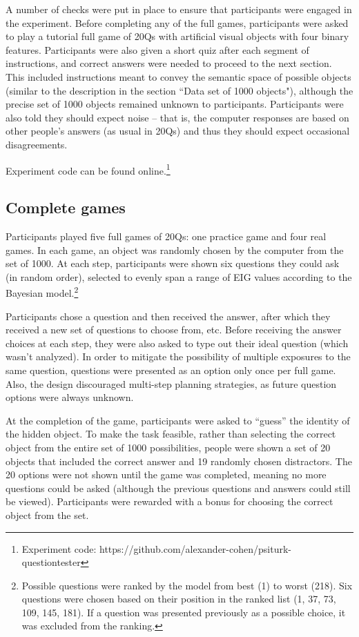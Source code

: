 \documentclass[11pt,letterpaper]{article}
\begin{document}
A number of checks were put in place to ensure that participants were engaged in the experiment. 
Before completing any of the full games, participants were asked to play a tutorial full game of 20Qs with artificial visual objects with four binary features. 
Participants were also given a short quiz after each segment of instructions, and correct answers were needed to proceed to the next section. 
This included instructions meant to convey the semantic space of possible objects (similar to the description in the section ``Data set of 1000 objects"), although the precise set of 1000 objects remained unknown to participants. 
Participants were also told they should expect noise -- that is, the computer responses are based on other people's answers (as usual in 20Qs) and thus they should expect occasional disagreements.

Experiment code can be found online.\footnote{Experiment code: https://github.com/alexander-cohen/psiturk-questiontester}

\subsection*{Complete games}

Participants played five full games of 20Qs: one practice game and four real games. 
In each game, an object was randomly chosen by the computer from the set of 1000. 
At each step, participants were shown six questions they could ask (in random order), selected to evenly span a range of EIG values according to the Bayesian model.\footnote{Possible questions were ranked by the model from best (1) to worst (218). 
Six questions were chosen based on their position in the ranked list (1, 37, 73, 109, 145, 181).
If a question was presented previously as a possible choice, it was excluded from the ranking.} 

Participants chose a question and then received the answer, after which they received a new set of questions to choose from, etc. Before receiving the answer choices at each step, they were also asked to type out their ideal question (which wasn't analyzed). 
In order to mitigate the possibility of multiple exposures to the same question, questions were presented as an option only once per full game.
Also, the design discouraged multi-step planning strategies, as future question options were always unknown.

At the completion of the game, participants were asked to ``guess'' the identity of the hidden object. 
To make the task feasible, rather than selecting the correct object from the entire set of 1000 possibilities, people were shown a set of 20 objects that included the correct answer and 19 randomly chosen distractors. 
The 20 options were not shown until the game was completed, meaning no more questions could be asked (although the previous questions and answers could still be viewed). 
Participants were rewarded with a bonus for choosing the correct object from the set.
\end{document}
